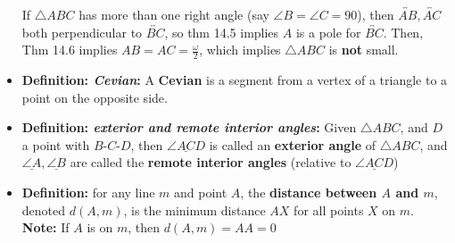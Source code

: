 \documentclass{report}
\begin{document}
\begin{itemize}
            If $\triangle ABC$ has more than one right angle (say $\angle B = \angle C = 90$), then $ \overleftrightarrow{AB}, \overleftrightarrow{AC}$ both perpendicular to $ \overleftrightarrow{BC}$, so thm 14.5 implies $A$ is a pole for $\overleftrightarrow{BC}$. Then, Thm 14.6 implies $AB = AC = \frac{\omega}{2}$, which implies $\triangle ABC$ is \textbf{not} small.
        \item \textbf{Definition: \textit{Cevian}:} A \textbf{Cevian} is a segment from a vertex of a triangle to a point on the opposite side.
        \item \textbf{Definition: \textit{exterior and remote interior angles}:} Given $ \triangle ABC$, and $D$ a point with $ B\text{-}C\text{-}D$, then $ \underline{\angle ACD} $ is called an \textbf{exterior angle} of $\triangle ABC$, and $ \underline{ \angle A}, \underline{ \angle B}$ are called the \textbf{remote interior angles} (relative to $ \underline{\angle ACD} $)
        \item \textbf{Definition:} for any line $m$ and point $A$, the \textbf{distance between $A$ and $m$}, denoted $d(A,m)$, is the minimum distance $AX$ for all points $X$ on $m$.
            \bigbreak \noindent 
            \textbf{Note:} If $A$ is on $m$, then $d(A,m) = AA = 0$

    \end{itemize}


    \pagebreak 
\end{document}
